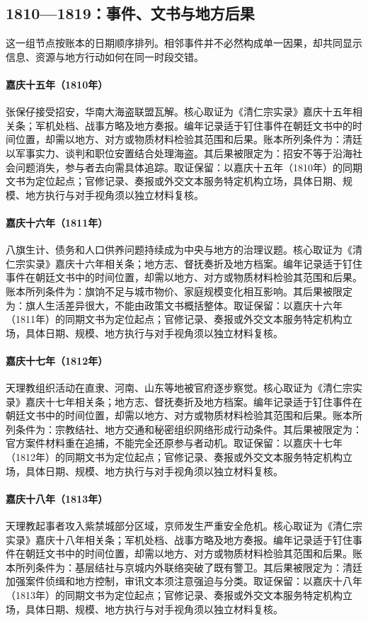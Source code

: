 \subsection{1810—1819：事件、文书与地方后果}
这一组节点按账本的日期顺序排列。相邻事件并不必然构成单一因果，却共同显示信息、资源与地方行动如何在同一时段交错。
\hypertarget{ledger:EQ-1810-ZHANG-BAOZAI-SURRENDER}{}\paragraph{嘉庆十五年（1810年）}张保仔接受招安，华南大海盗联盟瓦解。核心取证为《清仁宗实录》嘉庆十五年相关条；军机处档、战事方略及地方奏报。编年记录适于钉住事件在朝廷文书中的时间位置，却需以地方、对方或物质材料检验其范围和后果。账本所列条件为：清廷以军事实力、谈判和职位安置结合处理海盗。其后果被限定为：招安不等于沿海社会问题消失，参与者去向需具体追踪。取证保留：以嘉庆十五年（1810年）的同期文书为定位起点；官修记录、奏报或外交文本服务特定机构立场，具体日期、规模、地方执行与对手视角须以独立材料复核。
\hypertarget{ledger:EQ-1811-BANNER-LIVELIHOOD}{}\paragraph{嘉庆十六年（1811年）}八旗生计、债务和人口供养问题持续成为中央与地方的治理议题。核心取证为《清仁宗实录》嘉庆十六年相关条；地方志、督抚奏折及地方档案。编年记录适于钉住事件在朝廷文书中的时间位置，却需以地方、对方或物质材料检验其范围和后果。账本所列条件为：旗饷不足与城市物价、家庭规模变化相互影响。其后果被限定为：旗人生活差异很大，不能由政策文书概括整体。取证保留：以嘉庆十六年（1811年）的同期文书为定位起点；官修记录、奏报或外交文本服务特定机构立场，具体日期、规模、地方执行与对手视角须以独立材料复核。
\hypertarget{ledger:EQ-1812-TIANLI-PREPARATION}{}\paragraph{嘉庆十七年（1812年）}天理教组织活动在直隶、河南、山东等地被官府逐步察觉。核心取证为《清仁宗实录》嘉庆十七年相关条；地方志、督抚奏折及地方档案。编年记录适于钉住事件在朝廷文书中的时间位置，却需以地方、对方或物质材料检验其范围和后果。账本所列条件为：宗教结社、地方交通和秘密组织网络形成行动条件。其后果被限定为：官方案件材料重在追捕，不能完全还原参与者动机。取证保留：以嘉庆十七年（1812年）的同期文书为定位起点；官修记录、奏报或外交文本服务特定机构立场，具体日期、规模、地方执行与对手视角须以独立材料复核。
\hypertarget{ledger:EQ-1813-TIANLI-UPRISING}{}\paragraph{嘉庆十八年（1813年）}天理教起事者攻入紫禁城部分区域，京师发生严重安全危机。核心取证为《清仁宗实录》嘉庆十八年相关条；军机处档、战事方略及地方奏报。编年记录适于钉住事件在朝廷文书中的时间位置，却需以地方、对方或物质材料检验其范围和后果。账本所列条件为：基层结社与京城内外联络突破了既有警卫。其后果被限定为：清廷加强案件侦缉和地方控制，审讯文本须注意强迫与分类。取证保留：以嘉庆十八年（1813年）的同期文书为定位起点；官修记录、奏报或外交文本服务特定机构立场，具体日期、规模、地方执行与对手视角须以独立材料复核。
